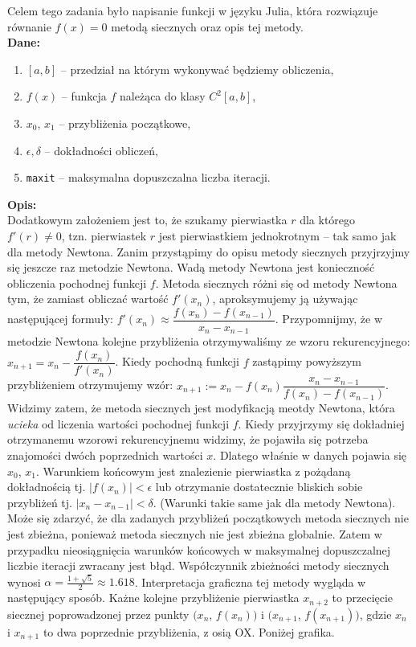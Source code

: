 \documentclass[]{article}
\begin{document}
	Celem tego zadania było napisanie funkcji w języku Julia, która rozwiązuje równanie $f(x) = 0$ metodą siecznych oraz opis tej metody.\\
	\textbf{Dane:}
	\begin{enumerate}[]
		\item $[a,b]$ -- przedział na którym wykonywać będziemy obliczenia,
		\item $f(x)$ -- funkcja $f$ należąca do klasy $C^2[a,b]$,
		\item $x_0$, $x_1$ -- przybliżenia początkowe,
		\item $\epsilon, \delta$ -- dokładności obliczeń,
		\item \texttt{maxit} -- maksymalna dopuszczalna liczba iteracji.
	\end{enumerate}
	\textbf{Opis:}\\
	Dodatkowym założeniem jest to, że szukamy pierwiastka $r$ dla którego $f'(r)\ne0$, tzn. pierwiastek $r$ jest pierwiastkiem jednokrotnym -- tak samo jak dla metody Newtona.
	Zanim przystąpimy do opisu metody siecznych przyjrzyjmy się jeszcze raz metodzie Newtona. Wadą metody Newtona jest konieczność obliczenia pochodnej funkcji $f$. Metoda siecznych różni się od metody Newtona tym, że zamiast obliczać wartość $f'(x_n)$, aproksymujemy ją używając następującej formuły: $f'(x_n) \approx \dfrac{f(x_n)-f(x_{n-1})}{x_n-x_{n-1}}$. Przypomnijmy, że w metodzie Newtona kolejne przybliżenia otrzymywaliśmy ze wzoru rekurencyjnego: $x_{n+1} = x_n - \dfrac{f(x_n)}{f'(x_n)}$. Kiedy pochodną funkcji $f$ zastąpimy powyższym przybliżeniem otrzymujemy wzór: $x_{n+1} := x_n - f(x_n)\dfrac{x_n-x_{n-1}}{f(x_n)-f(x_{n-1})}$. Widzimy zatem, że metoda siecznych jest modyfikacją meotdy Newtona, która \textit{ucieka} od liczenia wartości pochodnej funkcji $f$. Kiedy przyjrzymy się dokładniej otrzymanemu wzorowi rekurencyjnemu widzimy, że pojawiła się potrzeba znajomości dwóch poprzednich wartości $x$. Dlatego właśnie w danych pojawia się $x_0$, $x_1$. Warunkiem końcowym jest znalezienie pierwiastka z pożądaną dokładnością tj. $|f(x_n)|<\epsilon$ lub otrzymanie dostatecznie bliskich sobie przybliżeń tj. $|x_n-x_{n-1}|<\delta$. (Warunki takie same jak dla metody Newtona). Może się zdarzyć, że dla zadanych przybliżeń początkowych metoda siecznych nie jest zbieżna, ponieważ metoda siecznych nie jest zbieżna globalnie. Zatem w przypadku nieosiągnięcia warunków końcowych w maksymalnej dopuszczalnej liczbie iteracji zwracany jest błąd. Współczynnik zbieżności metody siecznych wynosi $\alpha = \frac{1+\sqrt{5}}{2}\approx1.618$. 
	Interpretacja graficzna tej metody wygląda w następujący sposób. Każne kolejne przybliżenie pierwiastka $x_{n+2}$ to przecięcie siecznej poprowadzonej przez punkty $(x_n$, $f(x_n))$ i $(x_{n+1}$, $f(x_{n+1}))$, gdzie $x_n$ i $x_{n+1}$ to dwa poprzednie przybliżenia, z osią OX. Poniżej grafika.
\end{document}
